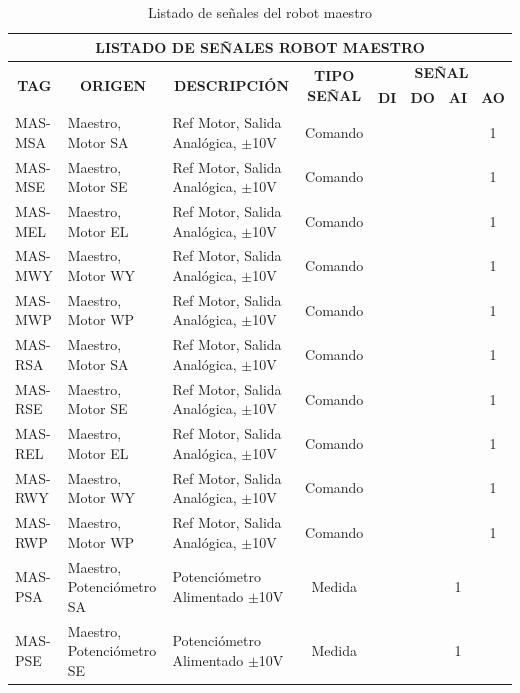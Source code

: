 \newpage
\begin{table}
  \centering
  \caption{Listado de señales del robot maestro}
    \begin{tabular}{lllccccc}
    \toprule
    \multicolumn{8}{c}{\textbf{LISTADO DE SEÑALES ROBOT MAESTRO}} \\
    \hline
    \multicolumn{1}{c}{\multirow{2}{*}{\textbf{TAG}}} & \multicolumn{1}{c}{\multirow{2}{*}{\textbf{ORIGEN}}} & \multicolumn{1}{c}{\multirow{2}{*}{\textbf{DESCRIPCIÓN}}} & \multicolumn{1}{c}{\multirow{2}{*}{\textbf{TIPO SEÑAL}}} & \multicolumn{4}{c}{\textbf{SEÑAL}} \\  
  &  &  & & \textbf{DI} & \textbf{DO} & \textbf{AI} & \textbf{AO} \\
    \hline
   MAS-MSA & Maestro, Motor SA & Ref Motor, Salida Analógica, $\pm$10V & Comando &       &       &       & 1 \\
    MAS-MSE & Maestro, Motor SE & Ref Motor, Salida Analógica, $\pm$10V & Comando &       &       &       & 1 \\
    MAS-MEL & Maestro, Motor EL & Ref Motor, Salida Analógica, $\pm$10V & Comando &       &       &       & 1 \\
    MAS-MWY & Maestro, Motor WY & Ref Motor, Salida Analógica, $\pm$10V & Comando &       &       &       & 1 \\
    MAS-MWP & Maestro, Motor WP & Ref Motor, Salida Analógica, $\pm$10V & Comando &       &       &       & 1 \\
    MAS-RSA & Maestro, Motor SA & Ref Motor, Salida Analógica, $\pm$10V & Comando &       &       &       & 1 \\
    MAS-RSE & Maestro, Motor SE & Ref Motor, Salida Analógica, $\pm$10V & Comando &       &       &       & 1 \\
    MAS-REL & Maestro, Motor EL & Ref Motor, Salida Analógica, $\pm$10V & Comando &       &       &       & 1 \\
    MAS-RWY & Maestro, Motor WY & Ref Motor, Salida Analógica, $\pm$10V & Comando &       &       &       & 1 \\
    MAS-RWP & Maestro, Motor WP & Ref Motor, Salida Analógica, $\pm$10V & Comando &       &       &       & 1 \\
    MAS-PSA & Maestro, Potenciómetro SA & Potenciómetro Alimentado $\pm$10V & Medida &       &       & 1     &  \\
    MAS-PSE & Maestro, Potenciómetro SE & Potenciómetro Alimentado $\pm$10V & Medida &       &       & 1     &  \\

\end{tabular}
\end{table}
